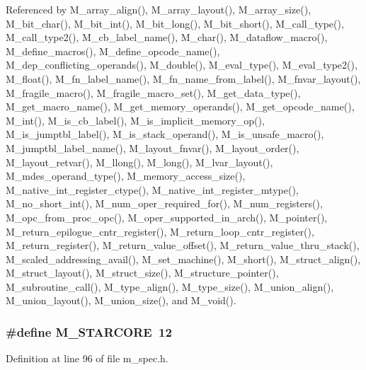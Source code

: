 Referenced by M\_\-array\_\-align(), M\_\-array\_\-layout(), M\_\-array\_\-size(), M\_\-bit\_\-char(), M\_\-bit\_\-int(), M\_\-bit\_\-long(), M\_\-bit\_\-short(), M\_\-call\_\-type(), M\_\-call\_\-type2(), M\_\-cb\_\-label\_\-name(), M\_\-char(), M\_\-dataflow\_\-macro(), M\_\-define\_\-macros(), M\_\-define\_\-opcode\_\-name(), M\_\-dep\_\-conflicting\_\-operands(), M\_\-double(), M\_\-eval\_\-type(), M\_\-eval\_\-type2(), M\_\-float(), M\_\-fn\_\-label\_\-name(), M\_\-fn\_\-name\_\-from\_\-label(), M\_\-fnvar\_\-layout(), M\_\-fragile\_\-macro(), M\_\-fragile\_\-macro\_\-set(), M\_\-get\_\-data\_\-type(), M\_\-get\_\-macro\_\-name(), M\_\-get\_\-memory\_\-operands(), M\_\-get\_\-opcode\_\-name(), M\_\-int(), M\_\-is\_\-cb\_\-label(), M\_\-is\_\-implicit\_\-memory\_\-op(), M\_\-is\_\-jumptbl\_\-label(), M\_\-is\_\-stack\_\-operand(), M\_\-is\_\-unsafe\_\-macro(), M\_\-jumptbl\_\-label\_\-name(), M\_\-layout\_\-fnvar(), M\_\-layout\_\-order(), M\_\-layout\_\-retvar(), M\_\-llong(), M\_\-long(), M\_\-lvar\_\-layout(), M\_\-mdes\_\-operand\_\-type(), M\_\-memory\_\-access\_\-size(), M\_\-native\_\-int\_\-register\_\-ctype(), M\_\-native\_\-int\_\-register\_\-mtype(), M\_\-no\_\-short\_\-int(), M\_\-num\_\-oper\_\-required\_\-for(), M\_\-num\_\-registers(), M\_\-opc\_\-from\_\-proc\_\-opc(), M\_\-oper\_\-supported\_\-in\_\-arch(), M\_\-pointer(), M\_\-return\_\-epilogue\_\-cntr\_\-register(), M\_\-return\_\-loop\_\-cntr\_\-register(), M\_\-return\_\-register(), M\_\-return\_\-value\_\-offset(), M\_\-return\_\-value\_\-thru\_\-stack(), M\_\-scaled\_\-addressing\_\-avail(), M\_\-set\_\-machine(), M\_\-short(), M\_\-struct\_\-align(), M\_\-struct\_\-layout(), M\_\-struct\_\-size(), M\_\-structure\_\-pointer(), M\_\-subroutine\_\-call(), M\_\-type\_\-align(), M\_\-type\_\-size(), M\_\-union\_\-align(), M\_\-union\_\-layout(), M\_\-union\_\-size(), and M\_\-void().
\subsubsection{\setlength{\rightskip}{0pt plus 5cm}\#define M\_\-STARCORE~12}\label{m__spec_8h_bf572fd89a96171df6d656bbd37f9f78}




Definition at line 96 of file m\_\-spec.h.

